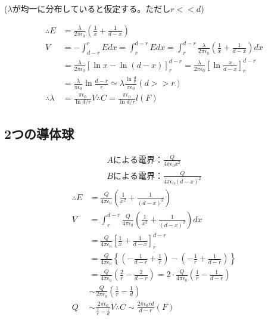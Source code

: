 \documentclass[12pt,fleqn]{ltjsarticle}
\begin{document}
($\lambda$が均一に分布していると仮定する。ただし$r<<d$)

\newcommand{\el}{\frac{\lambda}{2\pi\epsilon_0}}

\begin{align*}
\therefore E&=\el
\left(\frac 1x + \frac 1{d-x}\right)\\
V&=-\int^r_{d-r}Edx=\int^{d-r}_rEdx
=\int^{d-r}_r\el(\frac1x+\frac1{d-x})dx\\
&=\el[\ln x - \ln{(d-x)}]^{d-r}_r
=\el\left[\ln\frac x{d-x}\right]^{d-r}_r\\
&=\frac{\lambda}{\pi\epsilon_0}\ln\frac{d-r}r
\simeq \lambda\frac{\ln\frac dr}{\pi\epsilon_0}(d>>r)\\
\therefore \lambda&=\frac{\pi\epsilon_0}{\ln{d/r}}V
\therefore C=\frac{\pi\epsilon_0}{\ln{d/r}}l(F)
\end{align*}

\subsection{2つの導体球}
\renewcommand{\el}[1]{\frac Q{4\pi\epsilon_0 #1}}

\begin{align*}
Aによる電界：\el{x^2}\\
Bによる電界：\el{(d-x)^2}
\end{align*}
\begin{align*}
\therefore E&=\el{}\left(\frac 1{x^2} + \frac 1{(d-x)^2}\right)\\
V&=\int^{d-r}_r \el{}\left(\frac 1{x^2} + \frac 1{(d-x)^2}\right)dx\\
&=\el{}\left[\frac 1x + \frac 1{d-x}\right]^{d-r}_r\\
&=\el{}\left\{(-\frac1{d-r}+\frac1r)-(-\frac1r+\frac1{d-r})\right\}\\
&=\el{}\left(\frac2r-\frac2{d-r}\right)
=2\cdot\el{}\left(\frac1r-\frac1{d-r}\right)\\
&\sim \frac Q{2\pi\epsilon_0}(\frac1r - \frac 1d)\\
Q&\sim \frac{2\pi\epsilon_0}{\frac1r - \frac 1d}V
\therefore C\sim \frac{2\pi\epsilon_0rd}{d-r}(F)
\end{align*}
\end{document}
